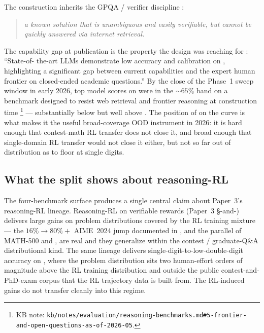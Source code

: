 The construction inherits the GPQA /  verifier discipline
\citep[\S{}sec-format]{phan2025-hle}:

\begin{quote}\itshape
a known solution that is unambiguous and easily verifiable, but
cannot be quickly answered via internet retrieval.
\end{quote}

The capability gap at publication is the property the design was
reaching for \citep[\S{}sec-capability-gap]{phan2025-hle}: ``State-of-
the-art LLMs demonstrate low accuracy and calibration on ,
highlighting a significant gap between current  capabilities and
the expert human frontier on closed-ended academic questions.'' By
the close of the Phase~1 sweep window in early 2026, top model
scores on  were in the $\sim 65\%$ band on a benchmark designed
to resist web retrieval and frontier reasoning at construction time%
\footnote{KB note: \nolinkurl{kb/notes/evaluation/reasoning-benchmarks.md#5-frontier-and-open-questions-as-of-2026-05}.}
--- substantially below   but well above .
The position of  on the  curve is what makes it the
useful broad-coverage OOD instrument in 2026: it is hard enough that
contest-math RL transfer does not close it, and broad enough that
single-domain RL transfer would not close it either, but not so far
out of distribution as to floor at single digits.

\subsection{What the split shows about reasoning-RL}
\label{sec:reasoning-rl-implications}

The four-benchmark surface produces a single central claim
about Paper~3's reasoning-RL lineage. Reasoning-RL on verifiable
rewards (Paper~3 §-and-) delivers large gains on
problem distributions covered by the RL training mixture --- the
$16\% \to 80\%+$ AIME~2024 jump documented in
\citet[\S{}3]{deepseek-r1}, and the parallel  of MATH-500
and , are real and they generalize within the contest /
graduate-Q\&A distributional kind. The same lineage delivers
single-digit-to-low-double-digit accuracy on , where
the problem distribution sits two human-effort orders of magnitude
above the RL training distribution and outside the public
contest-and-PhD-exam corpus that the RL trajectory data is built
from. The RL-induced gains do not transfer cleanly into this regime.


